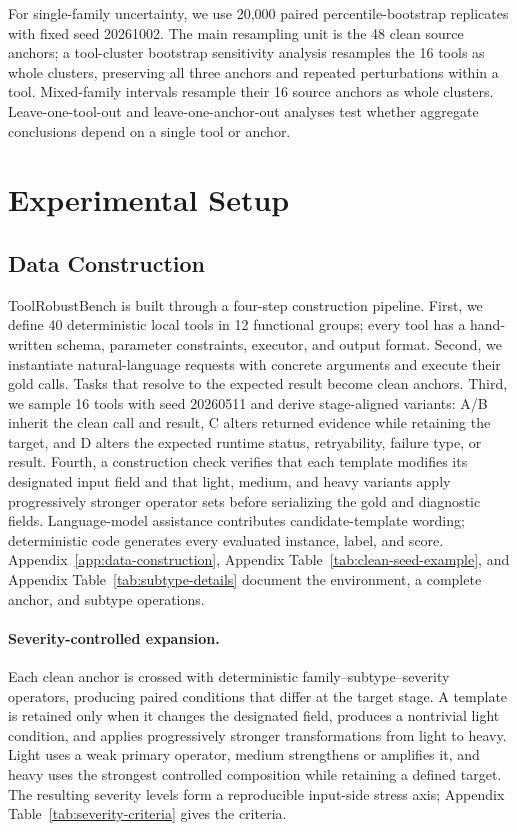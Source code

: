\documentclass[11pt]{article}
\newcommand{\ToolRobustBench}{ToolRobustBench\xspace}
\begin{document}
For single-family uncertainty, we use 20,000 paired percentile-bootstrap replicates with fixed seed 20261002. The main resampling unit is the 48 clean source anchors; a tool-cluster bootstrap sensitivity analysis resamples the 16 tools as whole clusters, preserving all three anchors and repeated perturbations within a tool. Mixed-family intervals resample their 16 source anchors as whole clusters. Leave-one-tool-out and leave-one-anchor-out analyses test whether aggregate conclusions depend on a single tool or anchor.

\section{Experimental Setup}

\subsection{Data Construction}
\label{sec:data-construction}

\ToolRobustBench{} is built through a four-step construction pipeline. First, we define 40 deterministic local tools in 12 functional groups; every tool has a hand-written schema, parameter constraints, executor, and output format. Second, we instantiate natural-language requests with concrete arguments and execute their gold calls. Tasks that resolve to the expected result become clean anchors. Third, we sample 16 tools with seed 20260511 and derive stage-aligned variants: A/B inherit the clean call and result, C alters returned evidence while retaining the target, and D alters the expected runtime status, retryability, failure type, or result. Fourth, a construction check verifies that each template modifies its designated input field and that light, medium, and heavy variants apply progressively stronger operator sets before serializing the gold and diagnostic fields. Language-model assistance contributes candidate-template wording; deterministic code generates every evaluated instance, label, and score. Appendix~\ref{app:data-construction}, Appendix Table~\ref{tab:clean-seed-example}, and Appendix Table~\ref{tab:subtype-details} document the environment, a complete anchor, and subtype operations.

\paragraph{Severity-controlled expansion.}
Each clean anchor is crossed with deterministic family--subtype--severity operators, producing paired conditions that differ at the target stage. A template is retained only when it changes the designated field, produces a nontrivial light condition, and applies progressively stronger transformations from light to heavy. Light uses a weak primary operator, medium strengthens or amplifies it, and heavy uses the strongest controlled composition while retaining a defined target. The resulting severity levels form a reproducible input-side stress axis; Appendix Table~\ref{tab:severity-criteria} gives the criteria.
\end{document}
